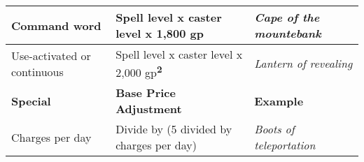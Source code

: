 \begin{longtable}{llllll}
\hline
\multicolumn{4}{p{1.366in}|}{\begin{minipage}[t]{1.366in}\raggedright
Command word \end{minipage}} & \multicolumn{1}{|p{1.506in}|}{\begin{minipage}[t]{1.506in}\raggedright
Spell level  x caster level  x 1,800 gp \end{minipage}} & \multicolumn{1}{p{1.628in}|}{\begin{minipage}[t]{1.628in}\raggedright
\textit{Cape of the mountebank}\end{minipage}}\\
\hline
\multicolumn{4}{p{1.366in}|}{\begin{minipage}[t]{1.366in}\raggedright
Use-activated or continuous \end{minipage}} & \multicolumn{1}{|p{1.506in}|}{\begin{minipage}[t]{1.506in}\raggedright
Spell level  x caster level  x 2,000 gp\textsuperscript{\textbf{2}}\textbf{ }\end{minipage}} & \multicolumn{1}{p{1.628in}|}{\begin{minipage}[t]{1.628in}\raggedright
\textit{Lantern of revealing}\end{minipage}}\\
\hline
\multicolumn{4}{p{1.366in}|}{\begin{minipage}[t]{1.366in}\raggedright
\textbf{Special }\end{minipage}} & \multicolumn{1}{|p{1.506in}|}{\begin{minipage}[t]{1.506in}\raggedright
\textbf{Base Price Adjustment }\end{minipage}} & \multicolumn{1}{p{1.628in}|}{\begin{minipage}[t]{1.628in}\raggedright
\textbf{Example}\end{minipage}}\\
\hline
\multicolumn{4}{p{1.366in}|}{\begin{minipage}[t]{1.366in}\raggedright
Charges per day \end{minipage}} & \multicolumn{1}{|p{1.506in}|}{\begin{minipage}[t]{1.506in}\raggedright
Divide by (5 divided by charges per day) \end{minipage}} & \multicolumn{1}{p{1.628in}|}{\begin{minipage}[t]{1.628in}\raggedright
\textit{Boots of teleportation}\end{minipage}}\\

\end{longtable}
